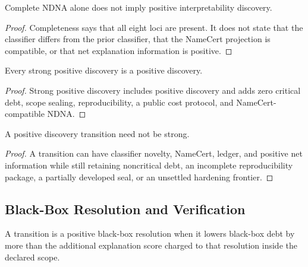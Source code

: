 \begin{theorem}
\label{thm:philosophy-ndna-completeness-alone-not-positive-discovery}
Complete NDNA alone does not imply positive interpretability discovery.
\end{theorem}
\begin{proof}
Completeness says that all eight loci are present. It does not state that
the classifier differs from the prior classifier, that the NameCert
projection is compatible, or that net explanation information is
positive.
\end{proof}

\begin{theorem}
\label{thm:philosophy-strong-positive-implies-positive}
Every strong positive discovery is a positive discovery.
\end{theorem}
\begin{proof}
Strong positive discovery includes positive discovery and adds zero
critical debt, scope sealing, reproducibility, a public cost protocol,
and NameCert-compatible NDNA.
\end{proof}

\begin{theorem}
\label{thm:philosophy-positive-need-not-be-strong}
A positive discovery transition need not be strong.
\end{theorem}
\begin{proof}
A transition can have classifier novelty, NameCert, ledger, and positive
net information while still retaining noncritical debt, an incomplete
reproducibility package, a partially developed seal, or an unsettled
hardening frontier.
\end{proof}

\subsection{Black-Box Resolution and Verification}
\label{subsec:philosophy-positive-discovery-black-box-verification}

\begin{definition}
\label{def:philosophy-positive-black-box-resolution}
A transition is a positive black-box resolution when it lowers
black-box debt by more than the additional explanation score charged to
that resolution inside the declared scope.
\end{definition}


